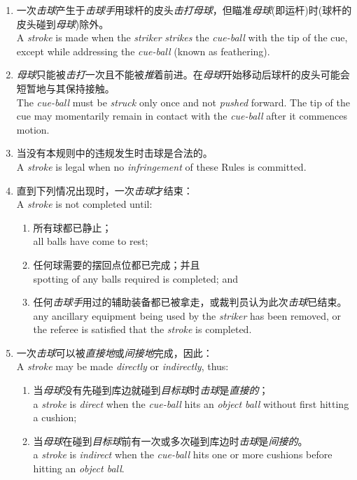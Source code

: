 \begin{enumerate}[label=(\alph*)]
    \item 一次\emph{击球}产生于\emph{击球手}用球杆的皮头\emph{击打}\emph{母球}，但瞄准\emph{母球}(即运杆)时(球杆的皮头碰到\emph{母球})除外。\\
    A \emph{stroke} is made when the \emph{striker} \emph{strikes} the \emph{cue-ball} with the tip of the cue, except while addressing the \emph{cue-ball} (known as feathering).
    \item \emph{母球}只能被\emph{击打}一次且不能被\emph{推}着前进。在\emph{母球}开始移动后球杆的皮头可能会短暂地与其保持接触。\\
    The \emph{cue-ball} must be \emph{struck} only once and not \emph{pushed} forward. The tip of the cue may momentarily remain in contact with the \emph{cue-ball} after it commences motion.
    \item 当没有本规则中的违规发生时击球是合法的。\\
    A \emph{stroke} is legal when no \emph{infringement} of these Rules is committed.
    \item 直到下列情况出现时，一次\emph{击球}才结束：\\
    A \emph{stroke} is not completed until:
    \begin{enumerate}[label=(\roman*)]
        \item 所有球都已静止；\\
        all balls have come to rest;
        \item 任何球需要的摆回点位都已完成；并且\\
        spotting of any balls required is completed; and
        \item 任何\emph{击球手}用过的辅助装备都已被拿走，或裁判员认为此次\emph{击球}已结束。\\
        any ancillary equipment being used by the \emph{striker} has been removed, or the referee is satisfied that the \emph{stroke} is completed.
    \end{enumerate}
    \item 一次\emph{击球}可以被\emph{直接地}或\emph{间接地}完成，因此：\\
    A \emph{stroke} may be made \emph{directly} or \emph{indirectly}, thus:
    \begin{enumerate}[label=(\roman*)]
        \item 当\emph{母球}没有先碰到库边就碰到\emph{目标球}时\emph{击球}是\emph{直接的}；\\
        a \emph{stroke} is \emph{direct} when the \emph{cue-ball} hits an \emph{object ball} without first hitting a cushion;
        \item 当\emph{母球}在碰到\emph{目标球}前有一次或多次碰到库边时\emph{击球}是\emph{间接的}。\\
        a \emph{stroke} is \emph{indirect} when the \emph{cue-ball} hits one or more cushions before hitting an \emph{object ball}.
    \end{enumerate}
\end{enumerate}

